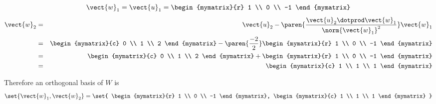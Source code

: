 \begin{solution}
\[
\vect{w}_1 = \vect{u}_1 = \begin{mymatrix}{r}
1 \\
0 \\
-1
\end{mymatrix}
\]
\begin{eqnarray*}
\vect{w}_2 &=& \vect{u}_2 - \paren{\frac{ \vect{u}_2 \dotprod \vect{w}_1}{\norm{\vect{w}_1}^2}}  \vect{w}_1\\
&=& \begin{mymatrix}{c}
0 \\
1 \\
2
\end{mymatrix}
-
\paren{
\frac{-2}{2}}
\begin{mymatrix}{r}
1 \\
0 \\
-1
\end{mymatrix}
\\
&=&
\begin{mymatrix}{c}
0 \\
1 \\
2
\end{mymatrix}
+
\begin{mymatrix}{r}
1 \\
0 \\
-1
\end{mymatrix} \\
&=&
\begin{mymatrix}{c}
1 \\
1 \\
1
\end{mymatrix}
\end{eqnarray*}

Therefore an orthogonal basis of $W$ is
\[
\set{\vect{w}_1, \vect{w}_2 } =
\set{
\begin{mymatrix}{r}
1 \\
0 \\
-1
\end{mymatrix},
\begin{mymatrix}{c}
1 \\
1 \\
1
\end{mymatrix}
}
\]


\end{solution}
